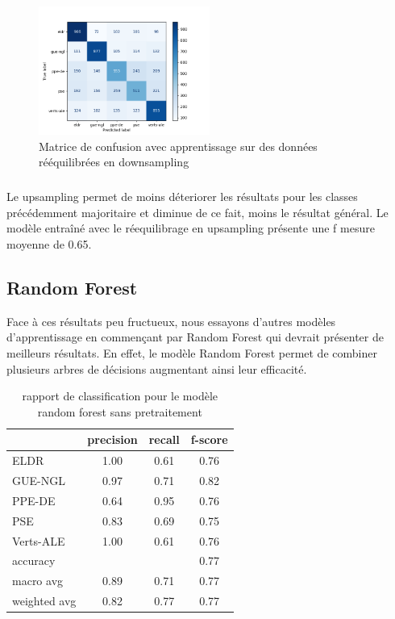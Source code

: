 \documentclass[11pt]{article}
\begin{document}
\begin{figure}[h]
\includegraphics[width=0.5\textwidth]{matriceConfusionTreeBalanced}
\caption{Matrice de confusion avec apprentissage sur des données rééquilibrées en downsampling}
\centering
\end{figure}

\subparagraph{}
Le upsampling permet de moins déteriorer les résultats pour les classes précédemment majoritaire et diminue de ce fait, moins le résultat général. Le modèle entraîné avec le réequilibrage en upsampling présente une f mesure moyenne de 0.65.

\subsection{Random Forest}
Face à ces résultats peu fructueux, nous essayons d'autres modèles d'apprentissage en commençant par Random Forest qui devrait présenter de meilleurs résultats. En effet, le modèle Random Forest permet de combiner plusieurs arbres de décisions augmentant ainsi leur efficacité.


\begin{table}[h]
\centering
\begin{tabular}{lccc}
\hline
 & precision & recall & f-score\\
\hline
ELDR & 1.00 & 0.61 & 0.76\\
GUE-NGL& 0.97 &0.71 & 0.82\\
PPE-DE & 0.64 &0.95 & 0.76\\ 
PSE &  0.83&  0.69 & 0.75\\ 
Verts-ALE &  1.00 & 0.61& 0.76\\
\hline
accuracy& & &    0.77 \\
macro avg &  0.89 &  0.71 &  0.77 \\
weighted avg &  0.82 & 0.77  &  0.77  \\
\hline
\end{tabular}
\caption{rapport de classification pour le modèle random forest sans pretraitement}
\label{tab:accents}
\end{table}
\end{document}
